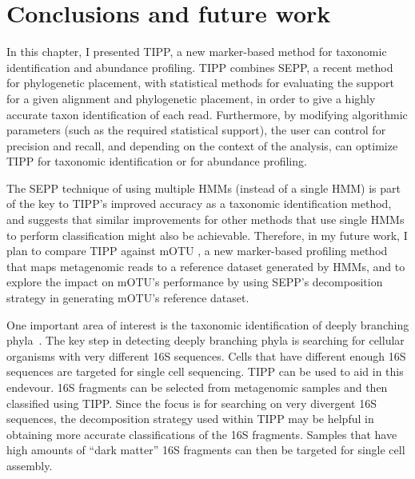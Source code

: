 \section{Conclusions and future work}\label{tipp:conclusion}
In this chapter, I presented TIPP, a new marker-based method for taxonomic identification and abundance profiling.  TIPP combines SEPP, a recent method for phylogenetic placement, with
statistical methods for evaluating the support for a given alignment and
phylogenetic placement, in order to give a highly accurate taxon
identification of each read.  Furthermore, by modifying
algorithmic parameters (such as the required statistical support), the user can
control for precision and recall, and depending on the context of the analysis, can optimize TIPP for taxonomic identification or for abundance profiling.

The SEPP technique of using multiple HMMs (instead of a single
HMM) is  part of the key to TIPP's improved 
accuracy as a taxonomic identification method, and suggests that
similar improvements for other methods that use single HMMs to 
perform classification 
might also be achievable. Therefore,
in my future work,
I plan to compare TIPP against mOTU \cite{Sunagawa2013}, a new marker-based profiling method that maps metagenomic reads to a reference dataset generated by HMMs, and to explore the impact on mOTU's performance by using SEPP's decomposition strategy in generating mOTU's reference dataset.

One important area of interest is the taxonomic identification of deeply branching phyla~\cite{dark-matter}.  The key step in detecting deeply branching phyla is searching for 
cellular organisms with very different 16S sequences.  Cells that have different enough 16S sequences are targeted for single cell sequencing.  TIPP can be used to aid in this endevour.  16S fragments can be selected from metagenomic samples and then classified using TIPP.  Since the focus is for searching on very divergent 16S sequences, the decomposition strategy used within TIPP may be helpful in obtaining more accurate classifications of the 16S fragments.  Samples that have high amounts of ``dark matter'' 16S fragments can then be targeted for single cell assembly.

